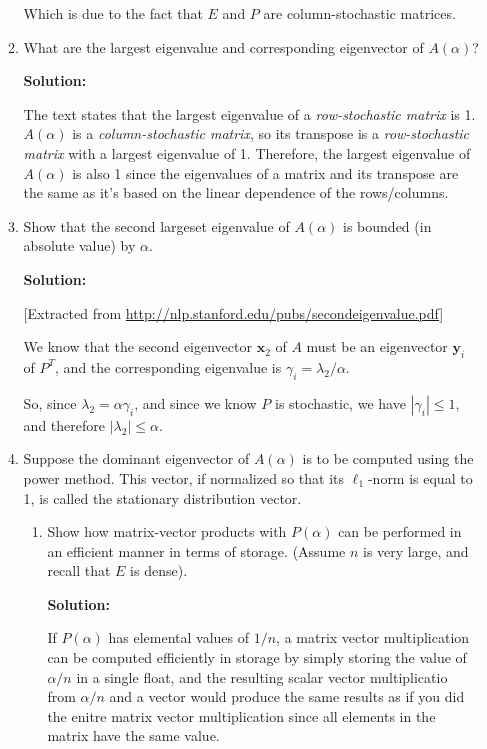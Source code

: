 \documentclass[12pt]{article}
\newcommand{\abs}[1]{\left| #1 \right|}
\newcommand{\vect}{\mathbf}
\begin{document}
\begin{enumerate}
\begin{enumerate}
  Which is due to the fact that $E$ and $P$ are column-stochastic matrices.

  \item What are the largest eigenvalue and corresponding eigenvector of $A(\alpha)$?

  {\bf Solution:}

  The text states that the largest eigenvalue of a {\em row-stochastic matrix} is 1. $A(\alpha)$
  is a {\em column-stochastic matrix}, so its transpose is a {\em row-stochastic matrix}
  with a largest eigenvalue of 1. Therefore, the largest eigenvalue of $A(\alpha)$ is
  also 1 since the eigenvalues of a matrix and its transpose are the same as it's based
  on the linear dependence of the rows/columns.

  \item Show that the second largeset eigenvalue of $A(\alpha)$ is bounded (in absolute value)
  by $\alpha$.

  {\bf Solution:}

    [Extracted from \url{http://nlp.stanford.edu/pubs/secondeigenvalue.pdf}]

    We know that the second eigenvector $\vect{x}_{2}$ of $A$ must be an eigenvector
    $\vect{y}_{i}$ of $P^{T}$, and the corresponding eigenvalue is $\gamma_{i} = \lambda_{2}/\alpha$.

    So, since $\lambda_{2} = \alpha \gamma_{i}$, and since we know $P$ is stochastic,
    we have $\abs{\gamma_{i}} \leq 1$, and therefore $\abs{\lambda_{2}} \leq \alpha$.


  \item Suppose the dominant eigenvector of $A(\alpha)$ is to be computed using
  the power method. This vector, if normalized so that its $\ell_{1}$-norm is
  equal to 1, is called the stationary distribution vector.

  \begin{enumerate}
    \item Show how matrix-vector products with $P(\alpha)$ can be performed in an
    efficient manner in terms of storage. (Assume $n$ is very large, and recall
    that $E$ is dense).

    {\bf Solution:}

    If $P(\alpha)$ has elemental values of $1/n$, a matrix vector multiplication can be computed
    efficiently in storage by simply storing the value of $\alpha /n$ in a single float, and
    the resulting scalar vector multiplicatio from $\alpha /n$ and a vector would produce the
    same results as if you did the enitre matrix vector multiplication since all elements
    in the matrix have the same value.


\end{enumerate}
\end{enumerate}
\end{enumerate}
\end{document}
